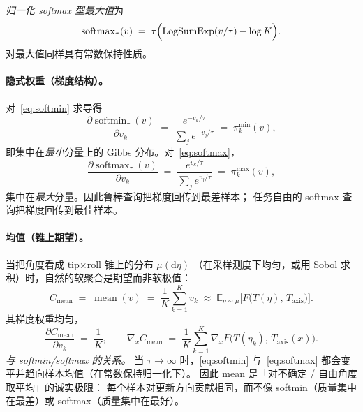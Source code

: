 \documentclass[UTF8,a4paper,11pt,fontset=fandol]{ctexart}
\newcommand{\Taxis}{T_{\mathrm{axis}}}
\newcommand{\softmin}{\operatorname{softmin}}
\newcommand{\softmax}{\operatorname{softmax}}
\newcommand{\LogSumExp}{\operatorname{LogSumExp}}
\begin{document}
\emph{归一化 softmax 型最大值}为
\begin{equation}
\label{eq:softmax}
  \softmax_{\tau}(v)
  \;=\;
  \tau\Bigl(
    \LogSumExp(v/\tau)
    -
    \log K
  \Bigr).
\end{equation}
对最大值同样具有常数保持性质。

\paragraph{隐式权重（梯度结构）。}
对~\eqref{eq:softmin} 求导得
\begin{equation}
\label{eq:softmin-grad}
  \frac{\partial\softmin_{\tau}(v)}{\partial v_{k}}
  \;=\;
  \frac{e^{-v_{k}/\tau}}{\sum_{j}e^{-v_{j}/\tau}}
  \;=\;
  \pi_{k}^{\mathrm{min}}(v),
\end{equation}
即集中在\emph{最小}分量上的 Gibbs 分布。对~\eqref{eq:softmax}，
\begin{equation}
\label{eq:softmax-grad}
  \frac{\partial\softmax_{\tau}(v)}{\partial v_{k}}
  \;=\;
  \frac{e^{v_{k}/\tau}}{\sum_{j}e^{v_{j}/\tau}}
  \;=\;
  \pi_{k}^{\mathrm{max}}(v),
\end{equation}
集中在\emph{最大}分量。因此鲁棒查询把梯度回传到最差样本；
任务自由的 softmax 查询把梯度回传到最佳样本。

\paragraph{均值（锥上期望）。}
当把角度看成 tip$\times$roll 锥上的分布 \(\mu(\mathrm{d}\eta)\)
（在采样测度下均匀，或用 Sobol 求积）时，自然的软聚合是期望而非软极值：
\begin{equation}
\label{eq:mean}
  C_{\mathrm{mean}}
  \;=\;
  \operatorname{mean}(v)
  \;=\;
  \frac{1}{K}\sum_{k=1}^{K} v_{k}
  \;\approx\;
  \mathbb{E}_{\eta\sim\mu}\bigl[F\bigl(T(\eta),\,\Taxis\bigr)\bigr].
\end{equation}
其梯度权重均匀，
\begin{equation}
\label{eq:mean-grad}
  \frac{\partial C_{\mathrm{mean}}}{\partial v_{k}}
  \;=\;
  \frac{1}{K},
  \qquad
  \nabla_{x} C_{\mathrm{mean}}
  \;=\;
  \frac{1}{K}\sum_{k=1}^{K}
  \nabla_{x} F\bigl(T(\eta_{k}),\,\Taxis(x)\bigr).
\end{equation}
\emph{与 softmin/softmax 的关系。}
当 \(\tau\to\infty\) 时，\eqref{eq:softmin} 与~\eqref{eq:softmax}
都会变平并趋向样本均值（在常数保持归一化下）。
因此 mean 是「对不确定 / 自由角度取平均」的诚实极限：
每个样本对更新方向贡献相同，而不像 softmin（质量集中在最差）或
softmax（质量集中在最好）。
\end{document}
